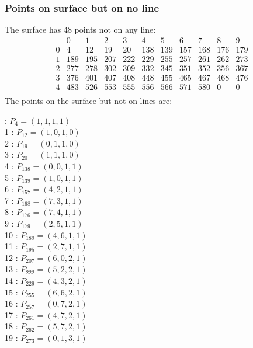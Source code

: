 \documentclass{article}
\begin{document}
{\subsubsection*{Points on surface but on no line}
The surface has 48 points not on any line:\\
$$
\begin{array}{r|*{10}{r}}
 & 0 & 1 & 2 & 3 & 4 & 5 & 6 & 7 & 8 & 9\\
\hline
0 & 4 & 12 & 19 & 20 & 138 & 139 & 157 & 168 & 176 & 179\\
1 & 189 & 195 & 207 & 222 & 229 & 255 & 257 & 261 & 262 & 273\\
2 & 277 & 278 & 302 & 309 & 332 & 345 & 351 & 352 & 356 & 367\\
3 & 376 & 401 & 407 & 408 & 448 & 455 & 465 & 467 & 468 & 476\\
4 & 483 & 526 & 553 & 555 & 556 & 566 & 571 & 580 & 0 & 0\\
\end{array}
$$
The points on the surface but not on lines are:\\
\begin{multicols}{2}
 : $P_{4}=( 1, 1, 1, 1 )$\\
1 : $P_{12}=( 1, 0, 1, 0 )$\\
2 : $P_{19}=( 0, 1, 1, 0 )$\\
3 : $P_{20}=( 1, 1, 1, 0 )$\\
4 : $P_{138}=( 0, 0, 1, 1 )$\\
5 : $P_{139}=( 1, 0, 1, 1 )$\\
6 : $P_{157}=( 4, 2, 1, 1 )$\\
7 : $P_{168}=( 7, 3, 1, 1 )$\\
8 : $P_{176}=( 7, 4, 1, 1 )$\\
9 : $P_{179}=( 2, 5, 1, 1 )$\\
10 : $P_{189}=( 4, 6, 1, 1 )$\\
11 : $P_{195}=( 2, 7, 1, 1 )$\\
12 : $P_{207}=( 6, 0, 2, 1 )$\\
13 : $P_{222}=( 5, 2, 2, 1 )$\\
14 : $P_{229}=( 4, 3, 2, 1 )$\\
15 : $P_{255}=( 6, 6, 2, 1 )$\\
16 : $P_{257}=( 0, 7, 2, 1 )$\\
17 : $P_{261}=( 4, 7, 2, 1 )$\\
18 : $P_{262}=( 5, 7, 2, 1 )$\\
19 : $P_{273}=( 0, 1, 3, 1 )$\\

\end{multicols}}
\end{document}
